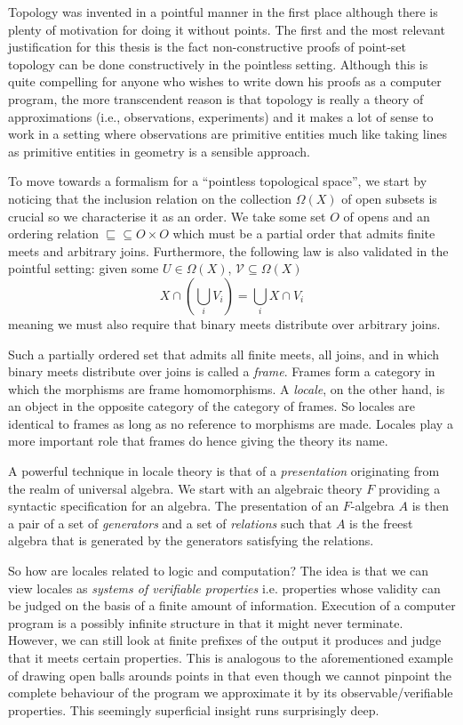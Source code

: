 \documentclass{article}
\begin{document}
Topology was invented in a pointful manner in the first place although there is plenty of
motivation for doing it without points. The first and the most relevant justification for
this thesis is the fact non-constructive proofs of point-set topology can be done
constructively in the pointless setting. Although this is quite compelling for anyone who
wishes to write down his proofs as a computer program, the more transcendent reason is
that topology is really a theory of approximations (i.e., observations, experiments) and
it makes a lot of sense to work in a setting where observations are primitive entities much
like taking lines as primitive entities in geometry is a sensible approach.

To move towards a formalism for a ``pointless topological space'', we start by noticing
that the inclusion relation on the collection $\Omega(X)$ of open subsets is crucial so we
characterise it as an order. We take some set $O$ of opens and an ordering relation $\sqsubseteq \subseteq O
\times O$ which must be a partial order that admits finite meets and arbitrary joins.
Furthermore, the following law is also validated in the pointful setting: given some $U \in
\Omega(X)$, $\mathcal{V} \subseteq \Omega(X)$
\begin{equation*}
  X \cap (\bigcup_{i} V_i) = \bigcup_{i} X \cap V_i
\end{equation*}
meaning we must also require that binary meets distribute over arbitrary joins.

Such a partially ordered set that admits all finite meets, all joins, and in which binary
meets distribute over joins is called a \emph{frame}. Frames form a category in which the
morphisms are frame homomorphisms. A \emph{locale}, on the other hand, is an object in the
opposite category of the category of frames. So locales are identical to frames as long as
no reference to morphisms are made. Locales play a more important role that frames do
hence giving the theory its name.

A powerful technique in locale theory is that of a \emph{presentation} originating from
the realm of universal algebra. We start with an algebraic theory $F$ providing a
syntactic specification for an algebra. The presentation of an $F$-algebra $A$ is then a
pair of a set of \emph{generators} and a set of \emph{relations} such that $A$ is the
freest algebra that is generated by the generators satisfying the relations.

So how are locales related to logic and computation? The idea is that we can view locales
as \emph{systems of verifiable properties} i.e. properties whose validity can be judged on
the basis of a finite amount of information. Execution of a computer program is a possibly
infinite structure in that it might never terminate. However, we can still look at finite
prefixes of the output it produces and judge that it meets certain properties. This is
analogous to the aforementioned example of drawing open balls arounds points in that even
though we cannot pinpoint the complete behaviour of the program we approximate it by its
observable/verifiable properties. This seemingly superficial insight runs surprisingly
deep.
\end{document}
